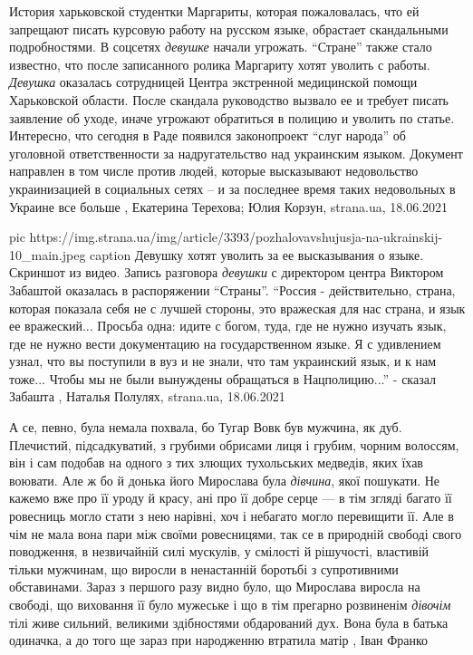 История харьковской студентки Маргариты, которая пожаловалась, что ей запрещают
писать курсовую работу на русском языке, обрастает скандальными подробностями.
В соцсетях \emph{девушке} начали угрожать. \enquote{Стране} также стало известно, что после
записанного ролика Маргариту хотят уволить с работы.  \emph{Девушка} оказалась
сотрудницей Центра экстренной медицинской помощи Харьковской области. После
скандала руководство вызвало ее и требует писать заявление об уходе, иначе
угрожают обратиться в полицию и уволить по статье.  Интересно, что сегодня в
Раде появился законопроект \enquote{слуг народа} об уголовной ответственности за
надругательство над украинским языком. Документ направлен в том числе против
людей, которые высказывают недовольство украинизацией в социальных сетях – и за
последнее время таких недовольных в Украине все больше
, 
Екатерина Терехова; Юлия Корзун, strana.ua, 18.06.2021

\ifcmt
  pic https://img.strana.ua/img/article/3393/pozhalovavshujusja-na-ukrainskij-10_main.jpeg
	caption Девушку хотят уволить за ее высказывания о языке. Скриншот из видео.
\fi
Запись разговора \emph{девушки} с директором центра Виктором Забаштой оказалась в
распоряжении \enquote{Страны}.  \enquote{Россия - действительно, страна,
которая показала себя не с лучшей стороны, это вражеская для нас страна, и язык
ее вражеский...  Просьба одна: идите с богом, туда, где не нужно изучать язык,
где не нужно вести документацию на государственном языке. Я с удивлением узнал,
что вы поступили в вуз и не знали, что там украинский язык, и к нам тоже...
Чтобы мы не были вынуждены обращаться в Нацполицию...} - сказал Забашта
, 
Наталья Полулях, strana.ua, 18.06.2021

А се, певно, була немала похвала, бо Тугар Вовк був мужчина, як дуб. Плечистий,
підсадкуватий, з грубими обрисами лиця і грубим, чорним волоссям, він і сам
подобав на одного з тих злющих тухольських медведів, яких їхав воювати. Але ж
бо й донька його Мирослава була \emph{дівчина}, якої пошукати. Не кажемо вже про її
уроду й красу, ані про її добре серце — в тім згляді багато її ровесниць могло
стати з нею нарівні, хоч і небагато могло перевищити її. Але в чім не мала вона
пари між своїми ровесницями, так се в природній свободі свого поводження, в
незвичайній силі мускулів, у смілості й рішучості, властивій тільки мужчинам,
що виросли в ненастанній боротьбі з супротивними обставинами. Зараз з першого
разу видно було, що Мирослава виросла на свободі, що виховання її було мужеське
і що в тім прегарно розвиненім \emph{дівочім} тілі живе сильний, великими здібностями
обдарований дух. Вона була в батька одиначка, а до того ще зараз при народженню
втратила матір
, Іван Франко
